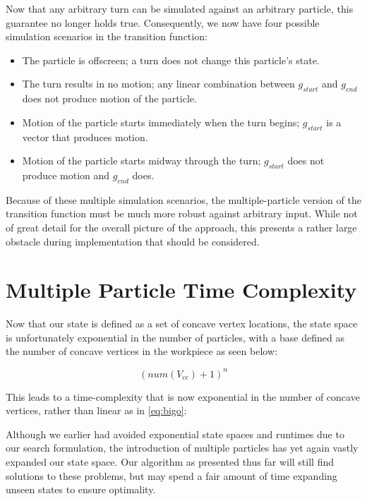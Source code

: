 Now that any arbitrary turn can be simulated against an arbitrary particle, this guarantee no longer holds true. Consequently, we now have four possible simulation scenarios in the transition function:


\begin{itemize}
\item The particle is offscreen; a turn does not change this particle's state.
\item The turn results in no motion; any linear combination between $g_{start}$ and $g_{end}$ does not produce motion of the particle.
\item Motion of the particle starts immediately when the turn begins; $g_{start}$ is a vector that produces motion.
\item Motion of the particle starts midway through the turn; $g_{start}$ does not produce motion and $g_{end}$ does.
\end{itemize}

Because of these multiple simulation scenarios, the multiple-particle version of the transition function must be much more robust against arbitrary input. While not of great detail for the overall picture of the approach, this presents a rather large obstacle during implementation that should be considered.

\section{Multiple Particle Time Complexity}

Now that our state is defined as a set of concave vertex locations, the state space is unfortunately exponential in the number of particles, with a base defined as the number of concave vertices in the workpiece as seen below:

$$
(num(V_{cc}) + 1)^n
$$

This leads to a time-complexity that is now exponential in the number of concave vertices, rather than linear as in \eqref{eq:bigo}:

 {
  \label{eq:bigoTotal}
}

Although we earlier had avoided exponential state spaces and runtimes due to our search formulation, the introduction of multiple particles has yet again vastly expanded our state space. Our algorithm as presented thus far will still find solutions to these problems, but may spend a fair amount of time expanding unseen states to ensure optimality.

